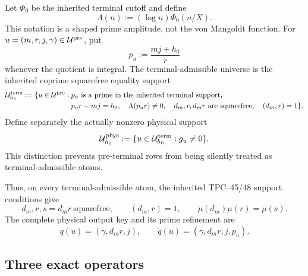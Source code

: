 Let \(\Phi_0\) be the inherited terminal cutoff and define
\begin{equation}
 \Lambda(n):=(\log n)\Phi_0(n/X).
 \label{eq:tpc55-terminal-Lambda}
\end{equation}
This notation is a shaped prime amplitude, not the von Mangoldt function.
For \(u=(m,r,j,\gamma)\in\mathcal U^{\rm pre}\), put
\begin{equation}
 p_u:=\frac{mj+h_0}{r}
 \label{eq:tpc55-terminal-prime}
\end{equation}
whenever the quotient is integral.  The terminal-admissible universe is
the inherited coprime squarefree equality support
\begin{equation}
 \begin{split}
 \mathcal U_{h_0}^{\rm term}:=\{u\in\mathcal U^{\rm pre}:{}&
 p_u\text{ is a prime in the inherited terminal support},\\
 &p_ur-mj=h_0,\quad \Lambda(p_ur)\ne0,\quad
 d_m,r,d_mr\text{ are squarefree},\quad(d_m,r)=1\}.
 \end{split}
 \label{eq:tpc55-terminal-universe}
\end{equation}
Define separately the actually nonzero physical support
\begin{equation}
 \mathcal U_{h_0}^{\rm phys}
 :=\{u\in\mathcal U_{h_0}^{\rm term}:g_u\ne0\}.
 \label{eq:tpc55-physical-active-set}
\end{equation}
This distinction prevents pre-terminal rows from being silently treated as
terminal-admissible atoms.

Thus, on every terminal-admissible atom, the inherited TPC--45/48 support
conditions \citep{WangTPC45,WangTPC48} give
\begin{equation}
 d_m, r, s=d_mr\ \text{squarefree},
 \qquad (d_m,r)=1,
 \qquad \mu(d_m)\mu(r)=\mu(s).
 \label{eq:tpc55-squarefree-support}
\end{equation}
The complete physical output key and its prime refinement are
\begin{equation}
 q(u)=(\gamma,d_mr,j),
 \qquad
 \widetilde q(u)=(\gamma,d_mr,j,p_u).
 \label{eq:tpc55-two-output-maps}
\end{equation}

\subsection{Three exact operators}

